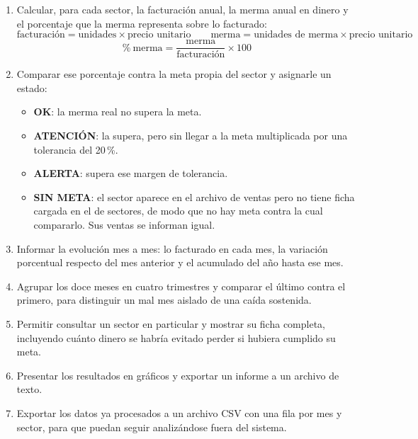 \documentclass[12pt]{article}
\begin{document}
\begin{enumerate}[leftmargin=1.5em, itemsep=0.3em]
    \item Calcular, para cada sector, la facturación anual, la merma anual en dinero y el porcentaje que la merma representa sobre lo facturado:
    \[
        \text{facturación} = \text{unidades} \times \text{precio unitario}
        \qquad
        \text{merma} = \text{unidades de merma} \times \text{precio unitario}
    \]
    \[
        \%\ \text{merma} = \frac{\text{merma}}{\text{facturación}} \times 100
    \]

    \item Comparar ese porcentaje contra la meta propia del sector y asignarle un estado:
    \begin{itemize}[leftmargin=1.5em, itemsep=0.1em]
        \item \textbf{OK}: la merma real no supera la meta.
        \item \textbf{ATENCIÓN}: la supera, pero sin llegar a la meta multiplicada por una tolerancia del 20\,\%.
        \item \textbf{ALERTA}: supera ese margen de tolerancia.
        \item \textbf{SIN META}: el sector aparece en el archivo de ventas pero no tiene ficha cargada en el de sectores, de modo que no hay meta contra la cual compararlo. Sus ventas se informan igual.
    \end{itemize}

    \item Informar la evolución mes a mes: lo facturado en cada mes, la variación porcentual respecto del mes anterior y el acumulado del año hasta ese mes.

    \item Agrupar los doce meses en cuatro trimestres y comparar el último contra el primero, para distinguir un mal mes aislado de una caída sostenida.

    \item Permitir consultar un sector en particular y mostrar su ficha completa, incluyendo cuánto dinero se habría evitado perder si hubiera cumplido su meta.

    \item Presentar los resultados en gráficos y exportar un informe a un archivo de texto.

    \item Exportar los datos ya procesados a un archivo CSV con una fila por mes y sector, para que puedan seguir analizándose fuera del sistema.
\end{enumerate}
\end{document}
